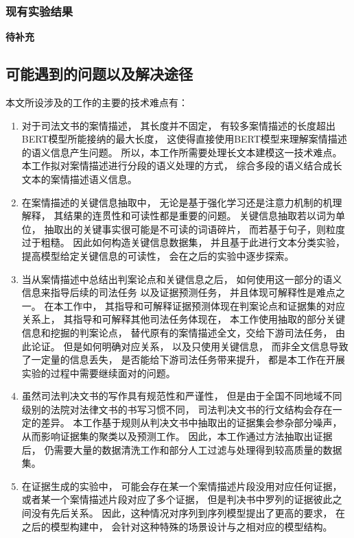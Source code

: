 \subsubsection{现有实验结果}

\textbf{\color{red}待补充}

\subsection{可能遇到的问题以及解决途径}
本文所设涉及的工作的主要的技术难点有：
\begin{enumerate}
    \item
          对于司法文书的案情描述，
          其长度并不固定，
          有较多案情描述的长度超出BERT模型所能接纳的最大长度，
          这使得直接使用BERT模型来理解案情描述的语义信息产生问题。
          所以，本工作所需要处理长文本建模这一技术难点。
          本工作拟对案情描述进行分段的语义处理的方式，
          综合多段的语义结合成长文本的案情描述语义信息。

    \item
          在案情描述的关键信息抽取中，
          无论是基于强化学习还是注意力机制的机理解释，
          其结果的连贯性和可读性都是重要的问题。
          关键信息抽取若以词为单位，
          抽取出的关键事实很可能是不可读的词语碎片，
          而若基于句子，则粒度过于粗糙。
          因此如何构造关键信息数据集，
          并且基于此进行文本分类实验，
          提高模型给定关键信息的可读性，
          会在之后的实验中逐步探索。

    \item
          当从案情描述中总结出判案论点和关键信息之后，
          如何使用这一部分的语义信息来指导后续的司法任务
          以及证据预测任务，
          并且体现可解释性是难点之一。
          在本工作中，
          其指导和可解释证据预测体现在判案论点和证据集的对应关系上，
          其指导和可解释其他司法任务体现在，
          本工作使用抽取的部分关键信息和挖掘的判案论点，
          替代原有的案情描述全文，交给下游司法任务，
          由此论证。
          但是如何明确对应关系，
          以及只使用关键信息，
          而非全文信息导致了一定量的信息丢失，
          是否能给下游司法任务带来提升，
          都是本工作在开展实验的过程中需要继续面对的问题。

    \item
          虽然司法判决文书的写作具有规范性和严谨性，
          但是由于全国不同地域不同级别的法院对法律文书的书写习惯不同，
          司法判决文书的行文结构会存在一定的差异。
          本工作基于规则从判决文书中抽取出的证据集会参杂部分噪声，
          从而影响证据集的聚类以及预测工作。
          因此，本工作通过方法抽取出证据后，
          仍需要大量的数据清洗工作和部分人工过滤与处理得到较高质量的数据集。

    \item
          在证据生成的实验中，
          可能会存在某一个案情描述片段没用对应任何证据，
          或者某一个案情描述片段对应了多个证据，
          但是判决书中罗列的证据彼此之间没有先后关系。
          因此，这种情况对序列到序列模型提出了更高的要求，
          在之后的模型构建中，
          会针对这种特殊的场景设计与之相对应的模型结构。


\end{enumerate}
